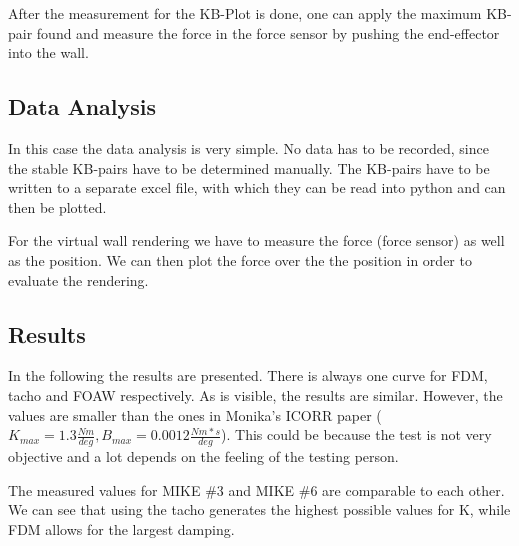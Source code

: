 After the measurement for the KB-Plot is done, one can apply the maximum KB-pair found and measure the force in the force sensor by pushing the end-effector into the wall. 


\subsection{Data Analysis}

In this case the data analysis is very simple. No data has to be recorded, since the stable KB-pairs have to be determined manually. The KB-pairs have to be written to a separate excel file, with which they can be read into python and can then be plotted.

For the virtual wall rendering we have to measure the force (force sensor) as well as the position. We can then plot the force over the the position in order to evaluate the rendering.

\subsection{Results}

In the following the results are presented. There is always one curve for FDM, tacho and FOAW respectively. As is visible, the results are similar. However, the values are smaller than the ones in Monika's ICORR paper ($K_{max} = 1.3\frac{Nm}{deg}, B_{max} = 0.0012\frac{Nm*s}{deg}$). This could be because the test is not very objective and a lot depends on the feeling of the testing person.

The measured values for MIKE \#3 and MIKE \#6 are comparable to each other. We can see that using the tacho generates the highest possible values for K, while FDM allows for the largest damping.

